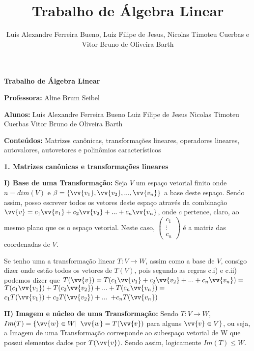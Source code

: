 \documentclass[11pt,a4paper]{article}
\author{Luis Alexandre Ferreira Bueno, Luiz Filipe de Jesus, Nicolas Timoteu Cuerbas e Vitor Bruno de Oliveira Barth}
\title{Trabalho de Álgebra Linear }
\newcommand\tab[1][1.835cm]{\hspace*{#1}}
\newcommand\tabb[1][2.2cm]{\hspace*{#1}}
\begin{document}
\begin{center}
\textbf{Trabalho de Álgebra Linear}
\end{center}

\begin{flushleft}

\textbf{Professora: }Aline Brum Seibel\linebreak

\textbf{Alunos: } Luis Alexandre Ferreira Bueno\linebreak 
\tab Luiz Filipe de Jesus\linebreak
\tab Nicolas Timoteu Cuerbas\linebreak
\tab Vitor Bruno de Oliveira Barth\linebreak
	
\textbf{Conteúdos:} Matrizes canônicas, transformações lineares, operadores lineares, autovalores, autovetores e polinômios característicos \linebreak

%
%

\textbf{1. Matrizes canônicas e transformações lineares} \linebreak


\tab \textbf{I) Base de uma Transformação:} Seja $V$ um espaço vetorial finito onde $ n = dim(V)$ e $\beta = \{ \vv{v_1}, \vv{v_2}, ..., \vv{v_n} \}$ a base deste espaço. Sendo assim, posso escrever todos os vetores deste espaço através da combinação $\vv{v} = c_1\vv{v_1} + c_2\vv{v_2} + ... + c_n\vv{v_n}$, onde $c$ pertence, claro, ao mesmo plano que os o espaço vetorial.  Neste caso, $\begin{pmatrix} c_1 \\ \vdots \\ c_n \end{pmatrix}$ é a matriz das coordenadas de $V$.\linebreak

\tabb Se tenho uma a transformação linear $T: V \rightarrow W$, assim como a base de $V$, consigo dizer onde estão todos os vetores de $T(V)$, pois segundo as regras c.i) e c.ii) podemos dizer que $T(\vv{v})=T(c_1\vv{v_1}+c_2\vv{v_2}+...+c_n\vv{v_n})=$ $T(c_1\vv{v_1})+T(c_2\vv{v_2})+...+T(c_n\vv{v_n})= $ $c_1T(\vv{v_1})+c_2T(\vv{v_2})+...$ $ + c_nT(\vv{v_n})$ \linebreak

\tab \textbf{II) Imagem e núcleo de uma Transformação:} Sendo $T: V \rightarrow W$, $Im(T) = \{ \vv{w} \in W | $ $ \vv{w} = T(\vv{v})$ para alguns $\vv{v} \in V\}$, ou seja, a Imagem de uma Transformação corresponde ao subespaço vetorial de W que possui elementos dados por $T(\vv{v})$. Sendo assim, logicamente $Im(T) \leq W$. \linebreak


\end{flushleft}
\end{document}
